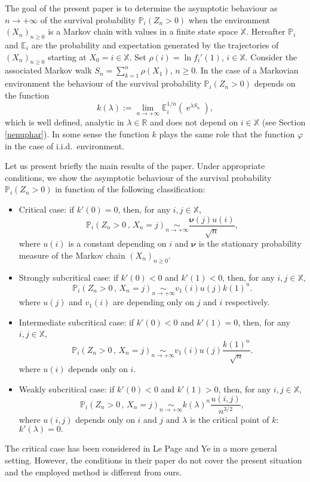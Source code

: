 \documentclass[12pt]{amsart}
\theoremstyle{definition}
\numberwithin{equation}{section}
\def\bb#1{\mathbb{#1}}
\def\bs#1{\boldsymbol{#1}}
\def\geq{\geqslant}
\def\phi{\varphi}
\renewcommand\ll{\lambda}
\DeclareMathOperator{\e}{e}
\begin{document}
The goal of the present paper is to determine the asymptotic behaviour as 
$n\to +\infty$ of the survival probability $\mathbb P_i (Z_n>0)$ 
when the environment
$\left( X_n \right)_{n\geq 0}$ is a Markov chain with values in a finite state space $\mathbb X.$
Hereafter $\mathbb P_i$ and $\mathbb E_i$ are the probability and expectation generated by the trajectories of $\left( X_n \right)_{n\geq 0}$
starting at $X_0=i \in \bb X.$
Set $\rho(i) = \ln  f_i'(1)$, $i \in \bb X$.
Consider the associated Markov walk  
$S_n =  \sum_{k=1}^n \rho\left( X_1 \right)$, $n \geq 0$.
In the case of a Markovian environment the behaviour of the survival probability $\mathbb P_i (Z_n>0)$ depends on the function  
\[
k(\ll) := \lim_{n\to +\infty} \bb E_i^{1/n} \left( \e^{\ll S_n} \right),
\]
which is well defined, analytic in $\ll \in \bb R$ and does not depend on $i \in \bb X$ (see Section \ref{nenuphar}).
In some sense the function $k$ plays the same role that the function $\phi$ in the case of i.i.d.\ environment.

Let us present briefly the main results of the paper. 
Under appropriate conditions, we show the asymptotic behaviour of the survival probability 
$\mathbb P_i (Z_n>0)$ in function of the following classification:
\begin{itemize}
\item Critical case:
if $k'(0)=0$, then, 
for any $i,j \in \bb X$,
\[
\bb P_i \left( Z_n > 0 \,,\, X_n = j \right) \underset{n \to +\infty}{\sim} \frac{\bs \nu (j) u(i)}{\sqrt{n}},
\]
where $u(i)$ is a constant depending on $i$ and $\bs \nu$ is the stationary probability measure of the Markov chain 
$\left( X_n \right)_{n\geq 0}$.
\item Strongly subcritical case:  if $k'(0)<0$ and $k'(1)<0$, then, for any $i,j \in \bb X$,
\[
\bb P_i \left( Z_n > 0 \,,\, X_n = j \right) \underset{n \to +\infty}{\sim}  v_1(i)u(j) k(1)^n .
\]
where $u(j)$ and $v_1(i)$ are depending only on $j$ and $i$ respectively.
\item Intermediate subcritical case: if $k'(0)<0$ and $k'(1)=0$, then, for any $i,j \in \bb X$,
\[
\bb P_i \left(  Z_n > 0 \,,\, X_n = j \right) \underset{n \to +\infty}{\sim}  v_1(i) u(j)  \frac{k(1)^n}{\sqrt{n}}.
\]
where $u(i)$ depends only on $i$. 
\item Weakly subcritical case: if $k'(0)<0$ and $k'(1)>0$, then, for any $i,j \in \bb X$,
\[
\bb P_i \left( Z_n > 0 \,,\, X_n = j \right) \underset{n \to +\infty}{\sim} k(\ll)^n \frac{u(i,j)}{n^{3/2}},
\]
where $u(i,j)$ depends only on $i$ and $j$ and $\ll$ is the critical point of $k$: $k'(\ll)=0.$
\end{itemize}
The critical case has been considered in Le Page and Ye \cite{le_page_survival_2010} in a more general setting. However, the conditions in their paper do not cover the present situation and the employed method is different from ours.
\end{document}
